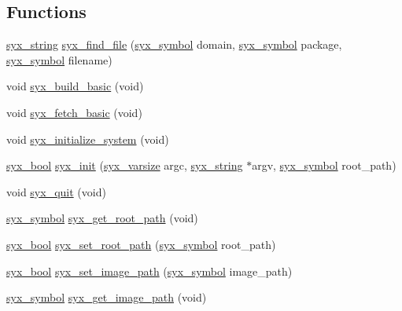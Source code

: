 \subsection*{Functions}
\begin{CompactItemize}
\item 
\hyperlink{syx-types_8h_1bff1fd86072dd98849437bc9dcb35c3}{syx\_\-string} \hyperlink{syx-init_8c_0a366be8ef1ce96df07d6084ccfaa249}{syx\_\-find\_\-file} (\hyperlink{syx-types_8h_9663af54b7b72f5d8be5f754ef356525}{syx\_\-symbol} domain, \hyperlink{syx-types_8h_9663af54b7b72f5d8be5f754ef356525}{syx\_\-symbol} package, \hyperlink{syx-types_8h_9663af54b7b72f5d8be5f754ef356525}{syx\_\-symbol} filename)
\item 
void \hyperlink{syx-init_8c_efeb166ace07f37fd380e8e290b18368}{syx\_\-build\_\-basic} (void)
\item 
void \hyperlink{syx-init_8c_7b86f133ac732b3916ff9b295a719b9c}{syx\_\-fetch\_\-basic} (void)
\item 
void \hyperlink{syx-init_8c_f7b7206eb53c182199d80bb08e014990}{syx\_\-initialize\_\-system} (void)
\item 
\hyperlink{syx-types_8h_c6dc09b276b99fa1956364359139daab}{syx\_\-bool} \hyperlink{syx-init_8c_890a4fe6fc8c8b546c995f03fb19d67d}{syx\_\-init} (\hyperlink{syx-types_8h_18e1a1417591a1efb670b97ce320f535}{syx\_\-varsize} argc, \hyperlink{syx-types_8h_1bff1fd86072dd98849437bc9dcb35c3}{syx\_\-string} $\ast$argv, \hyperlink{syx-types_8h_9663af54b7b72f5d8be5f754ef356525}{syx\_\-symbol} root\_\-path)
\item 
void \hyperlink{syx-init_8c_22715c2da20aedb6ef06b32053dc8a80}{syx\_\-quit} (void)
\item 
\hyperlink{syx-types_8h_9663af54b7b72f5d8be5f754ef356525}{syx\_\-symbol} \hyperlink{syx-init_8c_481a3f64c46f5b828aea978939c74e4c}{syx\_\-get\_\-root\_\-path} (void)
\item 
\hyperlink{syx-types_8h_c6dc09b276b99fa1956364359139daab}{syx\_\-bool} \hyperlink{syx-init_8c_ff01e7545e5741ba55b0584816243b05}{syx\_\-set\_\-root\_\-path} (\hyperlink{syx-types_8h_9663af54b7b72f5d8be5f754ef356525}{syx\_\-symbol} root\_\-path)
\item 
\hyperlink{syx-types_8h_c6dc09b276b99fa1956364359139daab}{syx\_\-bool} \hyperlink{syx-init_8c_40ee7fef8570d7cf610390faa9b1b0b1}{syx\_\-set\_\-image\_\-path} (\hyperlink{syx-types_8h_9663af54b7b72f5d8be5f754ef356525}{syx\_\-symbol} image\_\-path)
\item 
\hyperlink{syx-types_8h_9663af54b7b72f5d8be5f754ef356525}{syx\_\-symbol} \hyperlink{syx-init_8c_f196de4e97fe418abd021a26120fdc3c}{syx\_\-get\_\-image\_\-path} (void)
\end{CompactItemize}
